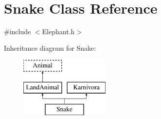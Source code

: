 \hypertarget{classSnake}{\section{Snake Class Reference}
\label{classSnake}
}


{\ttfamily \#include $<$Elephant.\-h$>$}

Inheritance diagram for Snake\-:\begin{figure}[H]
\begin{center}
\leavevmode
\includegraphics[height=3.000000cm]{classSnake}
\end{center}
\end{figure}
